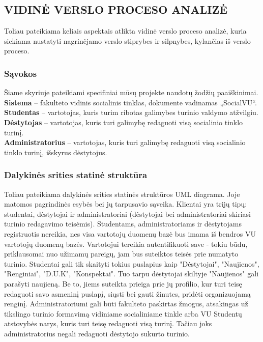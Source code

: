 \documentclass{VUMIFPSkursinis}
\begin{document}
\subsection{VIDINĖ VERSLO PROCESO ANALIZĖ}
Toliau pateikiama keliais aspektais atlikta vidinė verslo proceso analizė, kuria siekiama
nustatyti nagrinėjamo verslo stiprybes ir silpnybes, kylančias iš verslo proceso.

\subsubsection{Sąvokos}
Šiame skyriuje pateikiami specifiniai mūsų projekte naudotų žodžių paaiškinimai. \\
\textbf{Sistema} – fakulteto vidinis socialinis tinklas, dokumente vadinamas „SocialVU“. \\
\textbf{Studentas} – vartotojas, kuris turim ribotas galimybes turinio valdymo atžvilgiu.\\
\textbf{Dėstytojas} – vartotojas, kuris turi galimybę redaguoti visą socialinio tinklo turinį.\\
\textbf{Administratorius} – vartotojas, kuris turi galimybę redaguoti visą socialinio tinklo turinį, išskyrus dėstytojus.

\subsubsection{Dalykinės srities statinė struktūra}
 Toliau pateikiama dalykinės srities statinės struktūros UML diagrama. Joje matomos pagrindinės esybės bei jų tarpusavio sąveika. Klientai yra trijų tipų: studentai, dėstytojai ir administratoriai (dėstytojai bei administratoriai skiriasi turinio redagavimo teisėmis). Studentams, administratoriams ir dėstytojams registruotis nereikia, nes visa vartotojų duomenų bazė bus imama iš bendros VU vartotojų duomenų bazės. Vartotojui tereikia autentifikuoti save - tokiu būdu, priklausomai nuo užimamų pareigų, jam bus suteiktos teisės prie numatyto turinio. Studentai gali tik skaityti tokius puslapius kaip "Dėstytojai", "Naujienos", "Renginiai", "D.U.K", "Konspektai". Tuo tarpu dėstytojai skiltyje "Naujienos" gali parašyti naujieną. Be to, jiems suteikta prieiga prie jų profilio, kur turi teisę redaguoti savo asmeninį puslapį, siųsti bei gauti žinutes, pridėti organizuojamą renginį. Administratoriumi gali būti fakulteto paskirtas žmogus, atsakingas už tikslingo turinio formavimą vidiniame socialiniame tinkle arba VU Studentų atstovybės narys, kuris turi teisę redaguoti visą turinį. Tačiau joks administratorius negali redaguoti dėstytojo sukurto turinio.\\
\end{document}
